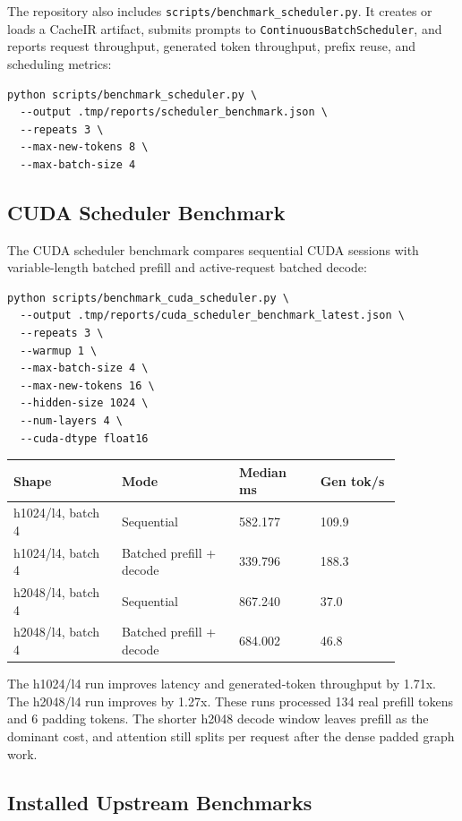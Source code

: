 \documentclass[11pt]{article}
\begin{document}
The repository also includes \texttt{scripts/benchmark\_scheduler.py}. It
creates or loads a CacheIR artifact, submits prompts to
\texttt{ContinuousBatchScheduler}, and reports request throughput, generated
token throughput, prefix reuse, and scheduling metrics:

\begin{lstlisting}
python scripts/benchmark_scheduler.py \
  --output .tmp/reports/scheduler_benchmark.json \
  --repeats 3 \
  --max-new-tokens 8 \
  --max-batch-size 4
\end{lstlisting}

\subsection{CUDA Scheduler Benchmark}

The CUDA scheduler benchmark compares sequential CUDA sessions with
variable-length batched prefill and active-request batched decode:

\begin{lstlisting}
python scripts/benchmark_cuda_scheduler.py \
  --output .tmp/reports/cuda_scheduler_benchmark_latest.json \
  --repeats 3 \
  --warmup 1 \
  --max-batch-size 4 \
  --max-new-tokens 16 \
  --hidden-size 1024 \
  --num-layers 4 \
  --cuda-dtype float16
\end{lstlisting}

\begin{longtable}{p{0.24\linewidth}p{0.26\linewidth}p{0.18\linewidth}p{0.18\linewidth}}
\toprule
\textbf{Shape} & \textbf{Mode} & \textbf{Median ms} & \textbf{Gen tok/s} \\
\midrule
h1024/l4, batch 4 & Sequential & 582.177 & 109.9 \\
h1024/l4, batch 4 & Batched prefill + decode & 339.796 & 188.3 \\
h2048/l4, batch 4 & Sequential & 867.240 & 37.0 \\
h2048/l4, batch 4 & Batched prefill + decode & 684.002 & 46.8 \\
\bottomrule
\end{longtable}

The h1024/l4 run improves latency and generated-token throughput by 1.71x. The
h2048/l4 run improves by 1.27x. These runs processed 134 real prefill tokens and
6 padding tokens. The shorter h2048 decode window leaves prefill as the dominant
cost, and attention still splits per request after the dense padded graph work.

\subsection{Installed Upstream Benchmarks}
\end{document}
